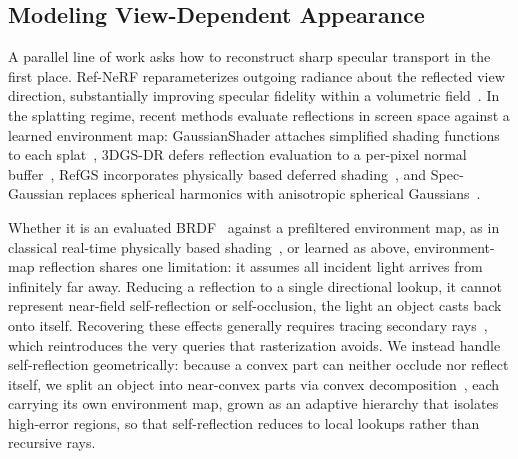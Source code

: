 \subsection{Modeling View-Dependent Appearance}
A parallel line of work asks how to reconstruct sharp specular transport in the first place.
Ref-NeRF reparameterizes outgoing radiance about the reflected view direction,
substantially improving specular fidelity within a volumetric field~\citep{refnerf}.
In the splatting regime, recent methods evaluate reflections in screen space against a learned environment map:
GaussianShader attaches simplified shading functions to each splat~\citep{gaussianShader},
3DGS-DR defers reflection evaluation to a per-pixel normal buffer~\citep{3dgsDR},
RefGS incorporates physically based deferred shading~\citep{refgs}, 
and Spec-Gaussian replaces spherical harmonics with anisotropic spherical Gaussians~\citep{specGaussian}.

Whether it is an evaluated BRDF~\citep{cookTorrance} against a prefiltered environment map, as in classical real-time physically based shading~\citep{karis2013pbr, RealTimeRendering},
or learned as above, environment-map reflection shares one limitation: it assumes all incident light arrives from infinitely far away.
Reducing a reflection to a single directional lookup, it cannot represent near-field self-reflection or self-occlusion, the light an object casts back onto itself.
Recovering these effects generally requires tracing secondary rays~\citep{refgs, 3dgsRayTracing}, which reintroduces the very queries that rasterization avoids.
We instead handle self-reflection geometrically: because a convex part can neither occlude nor reflect itself,
we split an object into near-convex parts via convex decomposition~\citep{coacd}, each carrying its own environment map,
grown as an adaptive hierarchy that isolates high-error regions, so that self-reflection reduces to local lookups rather than recursive rays.

